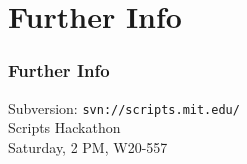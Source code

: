 \section{Further Info}
\begin{frame}
  \frametitle{Further Info}
  Subversion: {\tt svn://scripts.mit.edu/}
  \\
  Scripts Hackathon \\ Saturday, 2 PM, W20-557
\end{frame}
